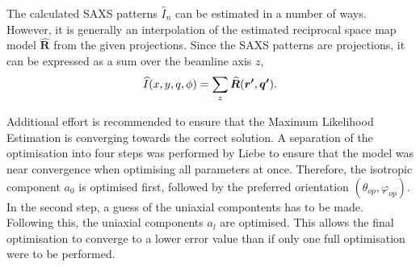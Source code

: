 The calculated SAXS patterns $\widehat{I}_{n}$ can be estimated in a number of ways.
However, it is generally an interpolation of the estimated reciprocal space map model $\bm{\widehat{R}}$ from the given projections.
Since the SAXS patterns are projections, it can be expressed as a sum over the beamline axis $z$,
\begin{equation}
    \widehat{I}(x,y,q,\phi) = \sum_{z} \bm{\widehat{R}}(\bm{r'}, \bm{q'}).
\end{equation}

Additional effort is recommended to ensure that the Maximum Likelihood Estimation is converging towards the correct solution.
A separation of the optimisation into four steps was performed by Liebe \cite{liebi2018small} to ensure that the model was near convergence when optimising all parameters at once.
Therefore, the isotropic component $a_{0}$ is optimised first, followed by the preferred orientation $(\theta_{op}, \varphi_{op})$. In the second step, a guess of the uniaxial compontents has to be made.
Following this, the uniaxial components $a_{l}$ are optimised.
This allows the final optimisation to converge to a lower error value than if only one full optimisation were to be performed.



